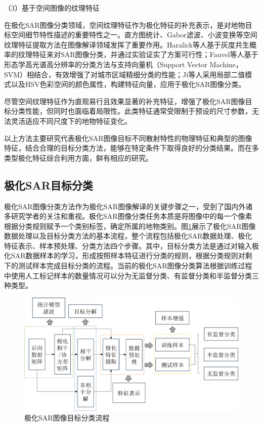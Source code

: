 （3）基于空间图像的纹理特征

在极化SAR图像分类领域，空间纹理特征作为极化特征的补充表示，是对地物目标空间细节特性描述的重要特性之一。直方图统计、Gabor滤波、小波变换等空间纹理特征提取方法在图像解译领域发挥了重要作用。Haralick等人基于灰度共生概率的纹理特征来对SAR图像分类，并通过实验证实了方案可行性；Fauvel等人基于形态学高光谱高分辨率的分类方法与支持向量机（Support Vector Machine，SVM）相结合，有效增强了对城市区域精细分类的性能；Ji等人采用局部二值模式以及HSV色彩空间的颜色属性，构建特征向量，应用于极化SAR图像分类。

尽管空间纹理特征作为直观易行且效果显著的补充特征，增强了极化SAR图像目标分类性能，但同时也面临着局限性。此类特征通常受限制于预设的尺寸参数，无法灵活适应不同尺度下的地物特征变化。


以上方法主要研究代表极化SAR图像目标不同散射特性的物理特征和典型的图像特征，结合合理的目标分类方法，能够在特定条件下取得良好的分类结果。而在多类型极化特征综合利用方面，鲜有相应的研究。

\subsection{极化SAR目标分类}
极化SAR图像分类方法作为极化SAR图像解译的关键步骤之一，受到了国内外诸多研究学者的关注和重视。极化SAR图像分类任务本质是将图像中的每一个像素根据分类规则赋予一个类别标签，确定所属的地物类别。图\ref{fig:极化SAR图像目标分类流程}展示了极化SAR图像数据处理以及目标分类方法的基本流程，整个流程包括极化SAR数据处理、极化特征表示、样本预处理、分类方法四个步骤。其中，目标分类方法是通过对输入极化SAR数据样本的学习，形成按照样本特征进行分类的规则，根据分类规则对剩下的测试样本完成目标分类的流程。当前的极化SAR图像分类算法根据训练过程中使用人工标记样本的数量情况可以分为无监督分类、有监督分类和半监督分类三种类型。

\begin{figure}[h]
    \includegraphics[width=12.3cm]{pic/chapter1/极化SAR分类流程.png}
    \caption{极化SAR图像目标分类流程}
    \label{fig:极化SAR图像目标分类流程}
\end{figure}


